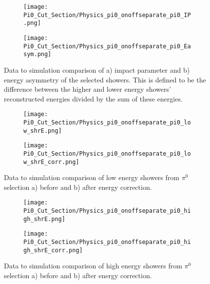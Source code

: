 \begin{figure}[H]
\centering
  \begin{subfigure}[t]{0.3\textwidth}
    \centering
\texttt{[image: Pi0\_Cut\_Section/Physics\_pi0\_onoffseparate\_pi0\_IP.png]}
  \caption{ }
  \end{subfigure} 
  \hspace{30mm}
  \begin{subfigure}[t]{0.3\textwidth}
    \centering
\texttt{[image: Pi0\_Cut\_Section/Physics\_pi0\_onoffseparate\_pi0\_Easym.png]}
  \caption{ }
  \end{subfigure} 
\label{fig:physics_pi0_pi0_IP}
\caption{ Data to simulation comparison of a) impact parameter and b) energy asymmetry of the selected showers. This is defined to be the difference between the higher and lower energy showers' reconstructed energies divided by the sum of these energies. }
\end{figure}

\begin{figure}[H]
\centering
  \begin{subfigure}[t]{0.3\textwidth}
    \centering
\texttt{[image: Pi0\_Cut\_Section/Physics\_pi0\_onoffseparate\_pi0\_low\_shrE.png]}
  \caption{ }
  \end{subfigure} 
  \hspace{30mm}
  \begin{subfigure}[t]{0.3\textwidth}
    \centering
\texttt{[image: Pi0\_Cut\_Section/Physics\_pi0\_onoffseparate\_pi0\_low\_shrE\_corr.png]}
  \caption{ }
  \end{subfigure} 
\label{fig:physics_pi0_pi0_low_e}
\caption{  Data to simulation comparison of low energy showers from $\pi^0$ selection a) before and b) after energy correction.}
\end{figure}

\begin{figure}[H]
\centering
  \begin{subfigure}[t]{0.3\textwidth}
    \centering
\texttt{[image: Pi0\_Cut\_Section/Physics\_pi0\_onoffseparate\_pi0\_high\_shrE.png]}
  \caption{ }
  \end{subfigure} 
  \hspace{30mm}
  \begin{subfigure}[t]{0.3\textwidth}
    \centering
\texttt{[image: Pi0\_Cut\_Section/Physics\_pi0\_onoffseparate\_pi0\_high\_shrE\_corr.png]}
  \caption{ }
  \end{subfigure} 
\label{fig:physics_pi0_pi0_e}
\caption{ Data to simulation comparison of high energy showers from $\pi^0$ selection a) before and b) after energy correction. }
\end{figure}



